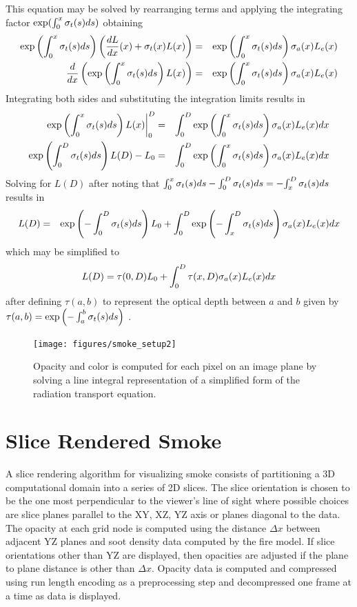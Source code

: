 This equation may be solved by rearranging terms and applying the
integrating factor $\exp(\int_0^x \sigma_t(s) ds)$ 
obtaining
\begin{eqnarray*}
\exp\left({\int_0^x \sigma_t(s) ds}\right)\left(\frac{dL}{dx}(x)+\sigma_t(x) L(x)\right)&=&  \exp\left({\int_0^x \sigma_t(s) ds}\right)\sigma_a(x) L_e(x)\\
\frac{d}{dx}\left(\exp\left({\int_0^x \sigma_t(s) ds}\right) L(x)\right)&=& \exp\left({\int_0^x \sigma_t(s) ds}\right)\sigma_a(x) L_e(x)
\end{eqnarray*}
Integrating both sides and substituting the integration limits
results in
\begin{eqnarray*}
\left.\exp\left({\int_0^x \sigma_t(s) ds}\right) L(x)\right|_0^D&=& \int_0^D\exp\left({\int_0^x \sigma_t(s) ds}\right)\sigma_a(x) L_e(x) dx \\
\exp\left({\int_0^D \sigma_t(s) ds}\right) L(D)-L_0&=& \int_0^D\exp\left({\int_0^x \sigma_t(s) ds}\right)\sigma_a(x) L_e(x) dx
\end{eqnarray*}
Solving for $L(D)$ after noting that
${\int_0^x \sigma_t(s) ds}-{\int_0^D \sigma_t(s) ds}=-{\int_x^D \sigma_t(s) ds}$ results in
\begin{eqnarray*}
L(D)&=&\exp\left({-\int_0^D \sigma_t(s) ds}\right) L_0+ \int_0^D\exp\left({-\int_x^D \sigma_t(s) ds}\right)\sigma_a(x) L_e(x) dx\\
\end{eqnarray*}
which may be simplified to
\begin{equation}
 L(D)=\tau(0,D)L_0 + \int_0^D\tau(x,D)\sigma_a(x)L_e(x) dx
\end{equation}
after defining $\tau(a,b)$ to represent the optical depth between $a$ and $b$ given
by $\tau(a,b)=\exp\left({-\int_a^b \sigma_t(s) ds}\right)$ .

\begin{figure}[\figoptions]
\begin{center}
\texttt{[image: figures/smoke\_setup2]}
\end{center}
\caption {Opacity and color is computed for each pixel on an image plane by solving a line integral
representation of a simplified form of the radiation transport equation.
}
\label{figsmokesetup2}
\end{figure}


%
%

\section{Slice Rendered Smoke}
A slice rendering algorithm for visualizing smoke consists of
partitioning a 3D computational domain into a series of 2D slices.
The slice orientation is chosen to be the one most perpendicular to the viewer's line
of sight where possible choices are slice planes parallel to the XY, XZ, YZ axis or planes diagonal to the data.  The opacity at each grid node is computed using the distance $\Delta x$ between adjacent YZ planes and soot density data computed by the fire model.  If slice orientations other than YZ are displayed, then opacities are adjusted if the plane to plane distance is other than $\Delta x$.  Opacity data is computed and compressed using run length encoding as a preprocessing step and decompressed one frame at a time as data is displayed.


